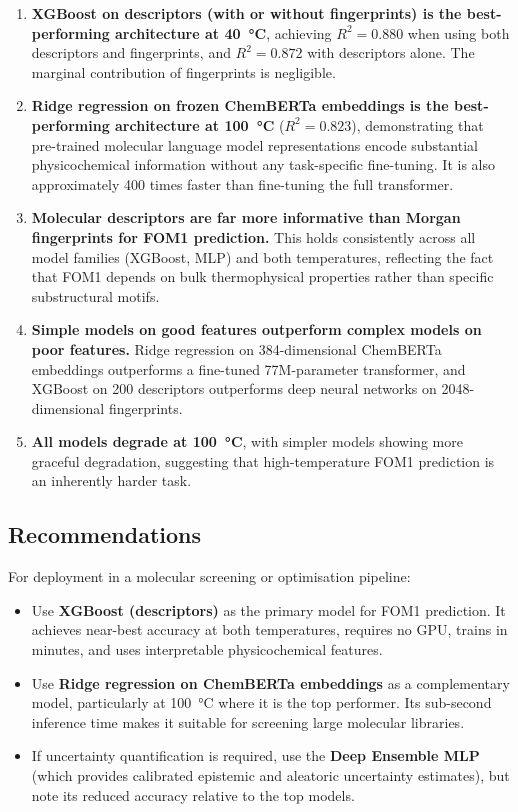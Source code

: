 \documentclass[11pt,a4paper]{article}
\begin{document}
\begin{enumerate}
    \item \textbf{XGBoost on descriptors (with or without fingerprints) is the best-performing architecture at \SI{40}{\degreeCelsius}}, achieving $R^2 = 0.880$ when using both descriptors and fingerprints, and $R^2 = 0.872$ with descriptors alone. The marginal contribution of fingerprints is negligible.

    \item \textbf{Ridge regression on frozen ChemBERTa embeddings is the best-performing architecture at \SI{100}{\degreeCelsius}} ($R^2 = 0.823$), demonstrating that pre-trained molecular language model representations encode substantial physicochemical information without any task-specific fine-tuning. It is also approximately 400 times faster than fine-tuning the full transformer.

    \item \textbf{Molecular descriptors are far more informative than Morgan fingerprints for FOM1 prediction.} This holds consistently across all model families (XGBoost, MLP) and both temperatures, reflecting the fact that FOM1 depends on bulk thermophysical properties rather than specific substructural motifs.

    \item \textbf{Simple models on good features outperform complex models on poor features.} Ridge regression on 384-dimensional ChemBERTa embeddings outperforms a fine-tuned 77M-parameter transformer, and XGBoost on 200 descriptors outperforms deep neural networks on 2048-dimensional fingerprints.

    \item \textbf{All models degrade at \SI{100}{\degreeCelsius}}, with simpler models showing more graceful degradation, suggesting that high-temperature FOM1 prediction is an inherently harder task.
\end{enumerate}

\subsection{Recommendations}

For deployment in a molecular screening or optimisation pipeline:
\begin{itemize}
    \item Use \textbf{XGBoost (descriptors)} as the primary model for FOM1 prediction. It achieves near-best accuracy at both temperatures, requires no GPU, trains in minutes, and uses interpretable physicochemical features.
    \item Use \textbf{Ridge regression on ChemBERTa embeddings} as a complementary model, particularly at \SI{100}{\degreeCelsius} where it is the top performer. Its sub-second inference time makes it suitable for screening large molecular libraries.
    \item If uncertainty quantification is required, use the \textbf{Deep Ensemble MLP} (which provides calibrated epistemic and aleatoric uncertainty estimates), but note its reduced accuracy relative to the top models.
\end{itemize}
\end{document}
